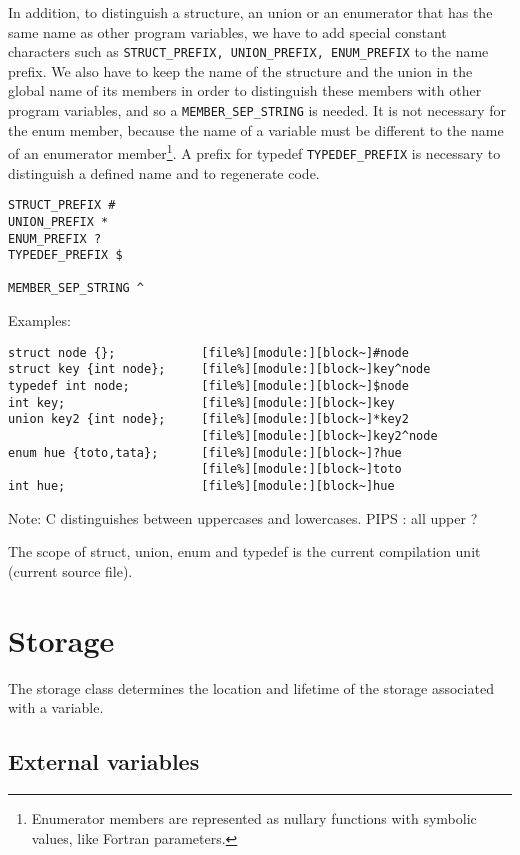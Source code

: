 \documentclass[a4paper]{report}
\begin{document}
In addition, to distinguish a structure, an union or an enumerator
that has the same name as other program variables, we have to add
special constant characters such as
\verb/STRUCT_PREFIX, UNION_PREFIX, ENUM_PREFIX/ to the name prefix. We
also have to keep the name of the structure and the union in the
global name of its members in order to distinguish these members with
other program variables, and so a \verb/MEMBER_SEP_STRING/ is needed.
It is not necessary for the enum member, because the name of a
variable must be different to the name of an enumerator
member\footnote{Enumerator members are represented as nullary
  functions with symbolic values, like Fortran parameters.}.  A prefix
for typedef \verb/TYPEDEF_PREFIX/ is necessary to distinguish a
defined name and to regenerate code.
\begin{verbatim}
STRUCT_PREFIX #
UNION_PREFIX *
ENUM_PREFIX ?
TYPEDEF_PREFIX $

MEMBER_SEP_STRING ^
\end{verbatim}  

Examples: 
\begin{verbatim}
struct node {};            [file%][module:][block~]#node
struct key {int node};     [file%][module:][block~]key^node 
typedef int node;          [file%][module:][block~]$node
int key;                   [file%][module:][block~]key
union key2 {int node};     [file%][module:][block~]*key2 
                           [file%][module:][block~]key2^node 
enum hue {toto,tata};      [file%][module:][block~]?hue
                           [file%][module:][block~]toto 
int hue;                   [file%][module:][block~]hue
\end{verbatim}   

Note: C distinguishes between uppercases and lowercases. PIPS : all upper
? 
 
The scope of struct, union, enum and typedef is the current compilation
unit (current source file).
 

\chapter{Storage}

The storage class determines the location and lifetime of the storage
associated with a variable. 

\section{External variables}
\end{document}
